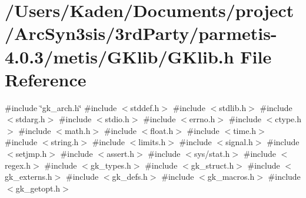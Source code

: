 \hypertarget{a00086}{}\section{/\+Users/\+Kaden/\+Documents/project/\+Arc\+Syn3sis/3rd\+Party/parmetis-\/4.0.3/metis/\+G\+Klib/\+G\+Klib.h File Reference}
\label{a00086}
{\ttfamily \#include \char`\"{}gk\+\_\+arch.\+h\char`\"{}}\newline
{\ttfamily \#include $<$stddef.\+h$>$}\newline
{\ttfamily \#include $<$stdlib.\+h$>$}\newline
{\ttfamily \#include $<$stdarg.\+h$>$}\newline
{\ttfamily \#include $<$stdio.\+h$>$}\newline
{\ttfamily \#include $<$errno.\+h$>$}\newline
{\ttfamily \#include $<$ctype.\+h$>$}\newline
{\ttfamily \#include $<$math.\+h$>$}\newline
{\ttfamily \#include $<$float.\+h$>$}\newline
{\ttfamily \#include $<$time.\+h$>$}\newline
{\ttfamily \#include $<$string.\+h$>$}\newline
{\ttfamily \#include $<$limits.\+h$>$}\newline
{\ttfamily \#include $<$signal.\+h$>$}\newline
{\ttfamily \#include $<$setjmp.\+h$>$}\newline
{\ttfamily \#include $<$assert.\+h$>$}\newline
{\ttfamily \#include $<$sys/stat.\+h$>$}\newline
{\ttfamily \#include $<$regex.\+h$>$}\newline
{\ttfamily \#include $<$gk\+\_\+types.\+h$>$}\newline
{\ttfamily \#include $<$gk\+\_\+struct.\+h$>$}\newline
{\ttfamily \#include $<$gk\+\_\+externs.\+h$>$}\newline
{\ttfamily \#include $<$gk\+\_\+defs.\+h$>$}\newline
{\ttfamily \#include $<$gk\+\_\+macros.\+h$>$}\newline
{\ttfamily \#include $<$gk\+\_\+getopt.\+h$>$}\newline
